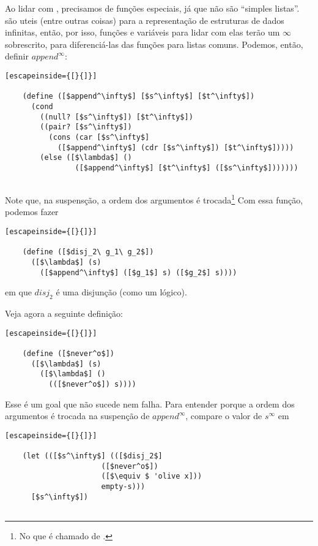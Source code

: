 \documentclass{article}
\begin{document}
  Ao lidar com , precisamos de funções especiais,
  já que não são ``simples listas''.  são uteis
  (entre outras coisas) para a representação de estruturas de dados
  infinitas, então, por isso, funções e variáveis para lidar com elas
  terão um $\infty$ sobrescrito, para diferenciá-las das funções para
  listas comuns. Podemos, então, definir $append^\infty$:

  \begin{lstlisting}[escapeinside={[}{]}]

    (define ([$append^\infty$] [$s^\infty$] [$t^\infty$])
      (cond
        ((null? [$s^\infty$]) [$t^\infty$])
        ((pair? [$s^\infty$])
          (cons (car [$s^\infty$]
            ([$append^\infty$] (cdr [$s^\infty$]) [$t^\infty$]))))
        (else ([$\lambda$] ()
                ([$append^\infty$] [$t^\infty$] ([$s^\infty$]))))))
        
  \end{lstlisting}

  \noindent Note que, na suspensção, a ordem dos argumentos é
  trocada\footnote{No que é chamado de  \cite{tramp}.}
  Com essa função, podemos fazer

  \begin{lstlisting}[escapeinside={[}{]}]

    (define ([$disj_2\ g_1\ g_2$])
      ([$\lambda$] (s)
        ([$append^\infty$] ([$g_1$] s) ([$g_2$] s))))

  \end{lstlisting}
      
  \noindent em que $disj_2$ é uma disjunção (como um 
  lógico). 

  Veja agora a seguinte definição:

  \begin{lstlisting}[escapeinside={[}{]}]

    (define ([$never^o$])
      ([$\lambda$] (s)
        ([$\lambda$] ()
          (([$never^o$]) s))))

  \end{lstlisting}

  \noindent Esse é um goal que não sucede nem falha. Para entender
  porque a ordem dos argumentos é trocada na suspenção de $append^\infty$,
  compare o valor de $s^\infty$ em
  \vspace{.7cm}

  \begin{lstlisting}[escapeinside={[}{]}]

    (let (([$s^\infty$] (([$disj_2$]
                      ([$never^o$])
                      ([$\equiv $ 'olive x]))
                      empty-s)))
      [$s^\infty$])
                      
  \end{lstlisting}
\end{document}
